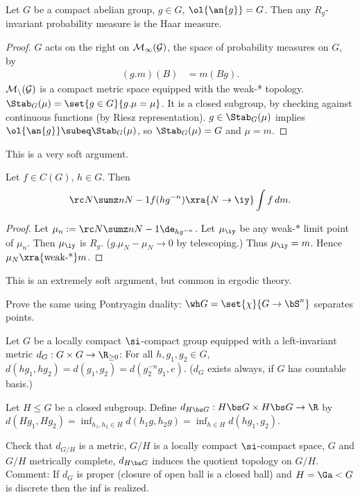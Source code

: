 \begin{pr}
Let $G$ be a compact abelian group, $g\in G$, $\ol{\an{g}}=G$. Then any $R_g$-invariant probability measure is the Haar measure.
\end{pr}
\begin{proof}
$G$ acts on the right on  $\cal M_1(G)$, the space of probability measures on $G$, by 
\begin{align}
(g.m)(B) &= m(Bg).
\end{align}
$\cal M_n(G)$ is a compact metric space equipped with the weak-* topology. 
$\Stab_G(\mu) = \set{g\in G}{g.\mu=\mu}$.
It is a closed subgroup, by checking against continuous functions (by Riesz representation).
$g\in \Stab_G(\mu)$ implies $\ol{\an{g}}\subeq \Stab_G(\mu)$, so $\Stab_G(\mu) = G$ and $\mu=m$.
\end{proof}
This is a very soft argument.
\begin{cor}
Let $f\in C(G)$, $h\in G$. Then
\begin{align}
\rc N \sumz n{N-1} f(hg^{-n}) \xra{N\to \iy} \int f\,dm.
\end{align}
\end{cor}
\begin{proof}
Let $\mu_n:=\rc N\sumz n{N-1}  \de_{hg^{-n}}$. 
Let $\mu_\iy$ be any weak-$*$ limit point of $\mu_n$. Then $\mu_\iy$ is $R_g$. ($g.\mu_N-\mu_N\to 0$ by telescoping.)
 Thus $\mu_\iy=m$. 
Hence $\mu_N \xra{\text{weak-*}} m$.
\end{proof}
This is an extremely soft argument, but common in ergodic theory.
\begin{exr}
Prove the same using Pontryagin duality: $\wh G=\set{\chi}{G\to \bS^n}$ separates points.
\end{exr}
Let $G$ be a locally compact $\si$-compact 
group equipped with a left-invariant metric $d_G:G\times G\to \R_{\ge 0}$:
For all $h,g_1,g_2\in G$, $d(hg_1,hg_2)=d(g_1,g_2)=d(g_2^{-n}g_1,e)$. ($d_G$ exists always, if $G$ has countable %
basis.)
\begin{df}
Let $H\le G$ be a closed subgroup. Define $d_{H\bs G}:H\bs G\times H\bs G\to \R$ by $d(Hg_1,Hg_2) = \inf_{h_1,h_2\in H} d(h_1g,h_2g) = \inf_{h\in H} d(hg_1,g_2)$. 
\end{df}
Check that $d_{G/H}$ is  a metric, $G/H$ is a locally compact $\si$-compact space, $G$ and $G/H$ metrically complete, $d_{H\bs G}$ induces the quotient topology on $G/H$.
Comment: If $d_G$ is proper (closure of open ball is a closed ball) and $H=\Ga < G$ is discrete then the inf is realized.

